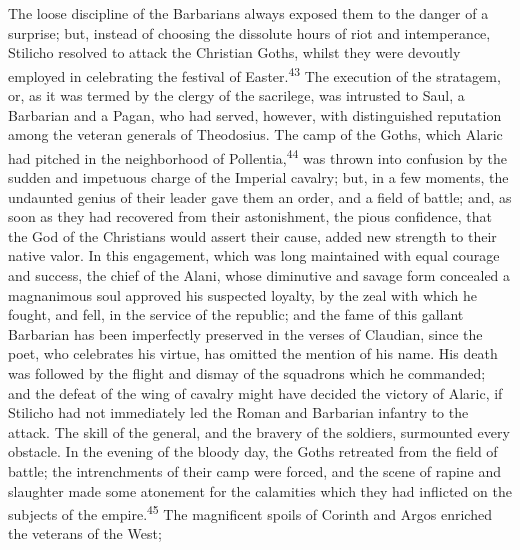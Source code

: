 

The loose discipline of the Barbarians always exposed them to the
danger of a surprise; but, instead of choosing the dissolute
hours of riot and intemperance, Stilicho resolved to attack the
Christian Goths, whilst they were devoutly employed in
celebrating the festival of Easter.\textsuperscript{43} The execution of the
stratagem, or, as it was termed by the clergy of the sacrilege,
was intrusted to Saul, a Barbarian and a Pagan, who had served,
however, with distinguished reputation among the veteran generals
of Theodosius. The camp of the Goths, which Alaric had pitched in
the neighborhood of Pollentia,\textsuperscript{44} was thrown into confusion by
the sudden and impetuous charge of the Imperial cavalry; but, in
a few moments, the undaunted genius of their leader gave them an
order, and a field of battle; and, as soon as they had recovered
from their astonishment, the pious confidence, that the God of
the Christians would assert their cause, added new strength to
their native valor. In this engagement, which was long maintained
with equal courage and success, the chief of the Alani, whose
diminutive and savage form concealed a magnanimous soul approved
his suspected loyalty, by the zeal with which he fought, and
fell, in the service of the republic; and the fame of this
gallant Barbarian has been imperfectly preserved in the verses of
Claudian, since the poet, who celebrates his virtue, has omitted
the mention of his name. His death was followed by the flight and
dismay of the squadrons which he commanded; and the defeat of the
wing of cavalry might have decided the victory of Alaric, if
Stilicho had not immediately led the Roman and Barbarian infantry
to the attack. The skill of the general, and the bravery of the
soldiers, surmounted every obstacle. In the evening of the bloody
day, the Goths retreated from the field of battle; the
intrenchments of their camp were forced, and the scene of rapine
and slaughter made some atonement for the calamities which they
had inflicted on the subjects of the empire.\textsuperscript{45} The magnificent
spoils of Corinth and Argos enriched the veterans of the West;
